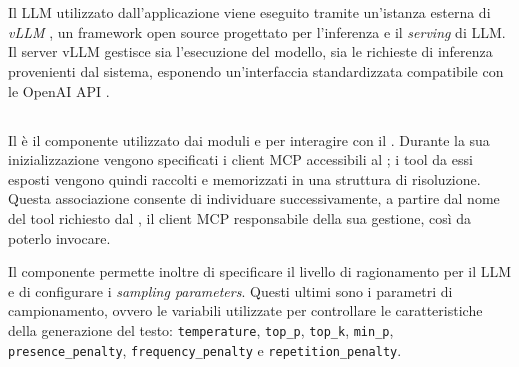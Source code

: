 
\section{\llm{}} \label{sec:llm} %


Il LLM utilizzato dall'applicazione viene eseguito tramite un'istanza esterna di \emph{vLLM} \cite{vllm2026vllm}, un framework open source progettato per l'inferenza e il \emph{serving} di LLM. Il server vLLM gestisce sia l'esecuzione del modello, sia le richieste di inferenza provenienti dal sistema, esponendo un'interfaccia standardizzata compatibile con le OpenAI API \cite{openai2026apidocs}.


\subsection{\llmclient{}} %

Il \llmclient{} è il componente utilizzato dai moduli \sreagent{} e \codeagent{} per interagire con il \llm{}. Durante la sua inizializzazione vengono specificati i client MCP accessibili al \llm{}; i tool da essi esposti vengono quindi raccolti e memorizzati in una struttura di risoluzione. Questa associazione consente di individuare successivamente, a partire dal nome del tool richiesto dal \llm{}, il client MCP responsabile della sua gestione, così da poterlo invocare.



Il componente permette inoltre di specificare il livello di ragionamento per il LLM e di configurare i \emph{sampling parameters}. Questi ultimi sono i parametri di campionamento, ovvero le variabili utilizzate per controllare le caratteristiche della generazione del testo: \texttt{temperature}, \texttt{top\_p}, \texttt{top\_k}, \texttt{min\_p}, \texttt{presence\_penalty}, \texttt{frequency\_penalty} e \texttt{repetition\_penalty}.

